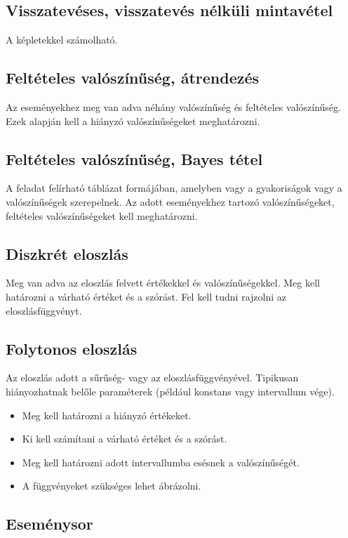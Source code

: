 \documentclass[a4paper]{article}
\begin{document}
\subsection{Visszatevéses, visszatevés nélküli mintavétel}

A képletekkel számolható.

\subsection{Feltételes valószínűség, átrendezés}

Az eseményekhez meg van adva néhány valószínűség és feltételes valószínűség.
Ezek alapján kell a hiányzó valószínűségeket meghatározni.

\subsection{Feltételes valószínűség, Bayes tétel}

A feladat felírható táblázat formájában, amelyben vagy a gyakoriságok vagy a valószínűségek szerepelnek.
Az adott eseményekhez tartozó valószínűségeket, feltételes valószínűségeket kell meghatározni.

\subsection{Diszkrét eloszlás}

Meg van adva az eloszlás felvett értékekkel és valószínűségekkel.
Meg kell határozni a várható értéket és a szórást.
Fel kell tudni rajzolni az eloszlásfüggvényt.

\subsection{Folytonos eloszlás}

Az eloszlás adott a sűrűség- vagy az eloszlásfüggvényével.
Tipikusan hiányozhatnak belőle paraméterek (például konstans vagy intervallum vége).
\begin{itemize}
\item Meg kell határozni a hiányzó értékeket.
\item Ki kell számítani a várható értéket és a szórást.
\item Meg kell határozni adott intervallumba esésnek a valószínűségét.
\item A függvényeket szükséges lehet ábrázolni.
\end{itemize}

\subsection{Eseménysor}
\end{document}
